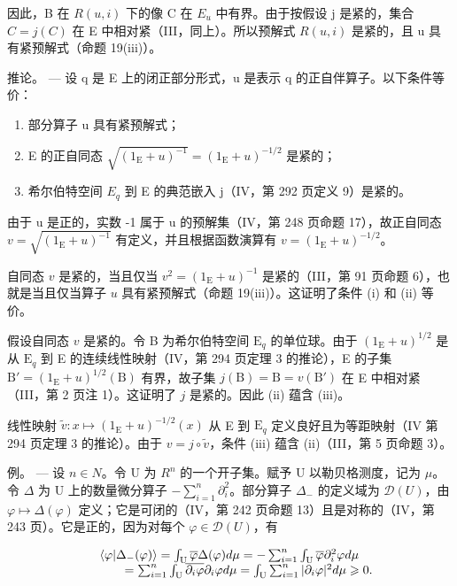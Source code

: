 因此，B 在 \(R(u,i)\) 下的像 C 在 \(E_{u}\) 中有界。由于按假设 j 是紧的，集合 \(C = j(C)\) 在 E 中相对紧（III，同上）。所以预解式 \(R(u,i)\) 是紧的，且 u 具有紧预解式（命题 19(iii)）。

推论。 --- 设 q 是 E 上的闭正部分形式，u 是表示 q 的正自伴算子。以下条件等价：

\begin{enumerate}
\def\labelenumi{(\roman{enumi})}
\item
  部分算子 u 具有紧预解式；
\item
  E 的正自同态 \(\sqrt{(1_{\mathrm{E}} + u)^{-1}} = (1_{\mathrm{E}} + u)^{-1 / 2}\) 是紧的；
\item
  希尔伯特空间 \(E_{q}\) 到 E 的典范嵌入 j（IV，第 292 页定义 9）是紧的。
\end{enumerate}

由于 u 是正的，实数 -1 属于 u 的预解集（IV，第 248 页命题 17），故正自同态 \(v = \sqrt{(1_{\mathrm{E}} + u)^{-1}}\) 有定义，并且根据函数演算有 \(v = (1_{\mathrm{E}} + u)^{-1/2}\)。

自同态 \(v\) 是紧的，当且仅当 \(v^2 = (1_{\mathrm{E}} + u)^{-1}\) 是紧的（III，第 91 页命题 6），也就是当且仅当算子 \(u\) 具有紧预解式（命题 19(iii)）。这证明了条件 (i) 和 (ii) 等价。

假设自同态 \(v\) 是紧的。令 B 为希尔伯特空间 \(\mathrm{E}_q\) 的单位球。由于 \((1_{\mathrm{E}} + u)^{1/2}\) 是从 \(\mathrm{E}_q\) 到 E 的连续线性映射（IV，第 294 页定理 3 的推论），E 的子集 \(\mathrm{B}' = (1_{\mathrm{E}} + u)^{1/2}(\mathrm{B})\) 有界，故子集 \(j(\mathrm{B}) = \mathrm{B} = v(\mathrm{B}')\) 在 E 中相对紧（III，第 2 页注 1）。这证明了 \(j\) 是紧的。因此 (ii) 蕴含 (iii)。

线性映射 \(\widetilde{v}\colon x\mapsto(1_{\mathrm{E}}+u)^{-1/2}(x)\) 从 E 到 \(\mathrm{E}_{q}\) 定义良好且为等距映射（IV 第 294 页定理 3 的推论）。由于 \(v=j\circ\widetilde{v}\)，条件 (iii) 蕴含 (ii)（III，第 5 页命题 3）。

例。 --- 设 \(n \in N\)。令 U 为 \(R^{n}\) 的一个开子集。赋予 U 以勒贝格测度，记为 \(\mu\)。令 \(\Delta\) 为 U 上的数量微分算子 \(-\sum_{i=1}^{n}\partial_{i}^{2}\)。部分算子 \(\Delta_{-}\) 的定义域为 \(\mathcal{D}(U)\)，由 \(\varphi \mapsto \Delta(\varphi)\) 定义；它是可闭的（IV，第 242 页命题 13）且是对称的（IV，第 243 页）。它是正的，因为对每个 \(\varphi \in \mathcal{D}(U)\)，有

\[
\begin{array}{r l} & {\langle \varphi | \Delta_ {-} (\varphi) \rangle = \int_ {\mathrm{U}} \overline {{\varphi}} \Delta (\varphi) d \mu = - \sum_ {i = 1} ^ {n} \int_ {\mathrm{U}} \overline {{\varphi}} \partial_ {i} ^ {2} \varphi d \mu} \\ & {\qquad = \sum_ {i = 1} ^ {n} \int_ {\mathrm{U}} \overline {{\partial_ {i} \varphi}} \partial_ {i} \varphi d \mu = \int_ {\mathrm{U}} \sum_ {i = 1} ^ {n} | \partial_ {i} \varphi | ^ {2} d \mu \geqslant 0.} \end{array}
\]

